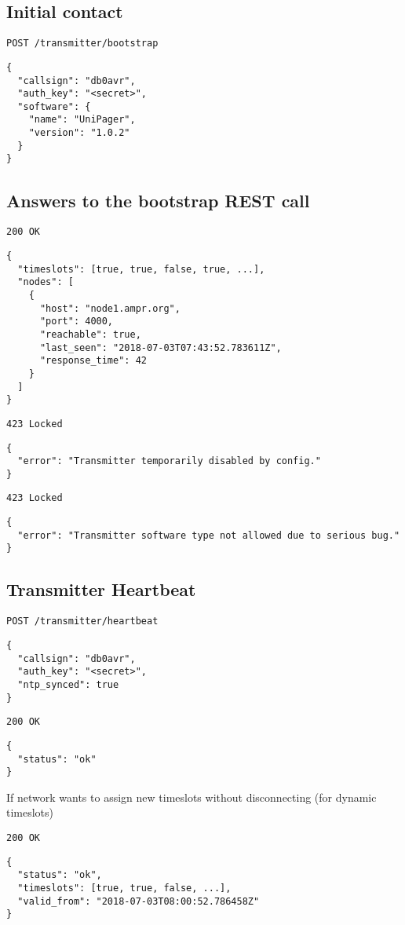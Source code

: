 \documentclass[a4paper]{article}
\begin{document}
\subsection{Initial contact}

\texttt{POST /transmitter/bootstrap}
\begin{lstlisting}
{
  "callsign": "db0avr",
  "auth_key": "<secret>",
  "software": {
    "name": "UniPager",
    "version": "1.0.2"
  }
}
\end{lstlisting}

\subsection{Answers to the bootstrap REST call}

\texttt{200 OK}
\begin{lstlisting}
{
  "timeslots": [true, true, false, true, ...],
  "nodes": [
    {
      "host": "node1.ampr.org",
      "port": 4000,
      "reachable": true,
      "last_seen": "2018-07-03T07:43:52.783611Z",
      "response_time": 42
    }
  ]
}
\end{lstlisting}

\texttt{423 Locked}
\begin{lstlisting}
{
  "error": "Transmitter temporarily disabled by config."
}
\end{lstlisting}

\texttt{423 Locked}
\begin{lstlisting}
{
  "error": "Transmitter software type not allowed due to serious bug."
}
\end{lstlisting}


\subsection{Transmitter Heartbeat}
\texttt{POST /transmitter/heartbeat}
\begin{lstlisting}
{
  "callsign": "db0avr",
  "auth_key": "<secret>",
  "ntp_synced": true
}
\end{lstlisting}

\texttt{200 OK}
\begin{lstlisting}
{
  "status": "ok"
}
\end{lstlisting}

If network wants to assign new timeslots without disconnecting (for dynamic timeslots)

\texttt{200 OK}
\begin{lstlisting}
{
  "status": "ok",
  "timeslots": [true, true, false, ...],
  "valid_from": "2018-07-03T08:00:52.786458Z"
}
\end{lstlisting}
\end{document}
